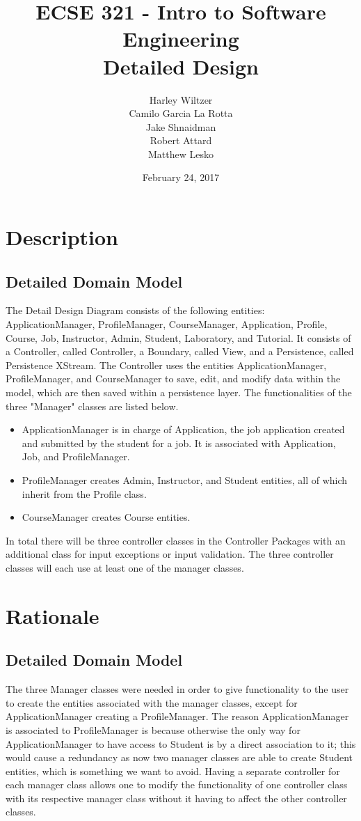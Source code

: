 \documentclass[12pt]{article}
\title{ECSE 321 - Intro to Software Engineering\\Detailed Design}
\author{Harley Wiltzer\\Camilo Garcia La Rotta\\Jake Shnaidman\\Robert Attard\\Matthew Lesko}
\date{February 24, 2017}
\begin{document}
\maketitle
\newpage
{} %
\tableofcontents
\section{Description}
\subsection{Detailed Domain Model}
The Detail Design Diagram consists of the following entities: ApplicationManager, ProfileManager,
CourseManager, Application, Profile, Course, Job, Instructor, Admin, Student, Laboratory, and
Tutorial. It consists of a Controller, called Controller, a Boundary, called View, and a
Persistence, called Persistence XStream. The Controller uses the entities ApplicationManager,
ProfileManager, and CourseManager to save, edit, and modify data within the model, which are then
saved within a persistence layer. The functionalities of the three "Manager" classes are listed
below.
\begin{itemize}
	\item ApplicationManager is in charge of Application, the job application created and submitted
		by the student for a job. It is associated with Application, Job, and ProfileManager.
	\item ProfileManager creates Admin, Instructor, and Student entities, all of which inherit from
		the Profile class.
	\item CourseManager creates Course entities.
\end{itemize}
In total there will be three controller classes in the Controller Packages with an additional class
for input exceptions or input validation. The three controller classes will each use at least one of
the manager classes.
\section{Rationale}
\subsection{Detailed Domain Model}
The three Manager classes were needed in order to give functionality to the user to create the
entities associated with the manager classes, except for ApplicationManager creating a
ProfileManager. The reason ApplicationManager is associated to ProfileManager is because otherwise
the only way for ApplicationManager to have access to Student is by a direct association to it; this
would cause a redundancy as now two manager classes are able to create Student entities, which is
something we want to avoid. Having a separate controller for each manager class allows one to modify
the functionality of one controller class with its respective manager class without it having to
affect the other controller classes.
\end{document}
